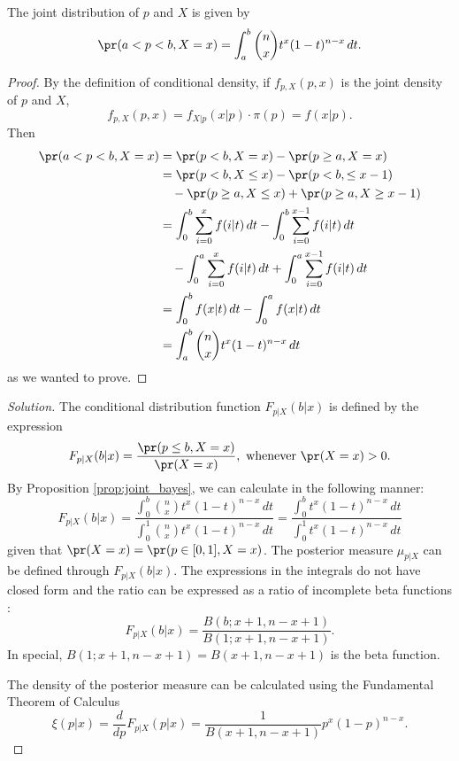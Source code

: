 \begin{proposition}
    \label{prop:joint_bayes}
    The joint distribution of $p$ and $X$ is given by
    \begin{equation*}
     \pr(a < p < b, X = x) = \int_{a}^{b} \binom{n}{x} t^x(1-t)^{n-x}\,dt.
    \end{equation*}
\end{proposition}

\begin{proof}
    By the definition of conditional density, if $f_{p,X}(p, x)$ is the
    joint density of $p$ and $X$, 
    $$
    f_{p,X}(p, x) = f_{X|p}(x|p)\cdot \pi(p) = f(x|p).$$  
    Then 
    \begin{equation*}
        \begin{split}
            \pr(a < p < b, X = x) &= \pr(p < b, X = x) - \pr(p \ge a, X = x) \\ 
            &= \pr(p < b, X \le x) - \pr(p < b, \le x - 1) \\
            &~~~- \pr(p \ge a, X \le x) + \pr(p \ge a, X \ge x -1) \\
            &= \int_0^b \sum_{i=0}^x f(i|t) \, dt - \int_0^b \sum_{i=0}^{x-1} f(i|t) \, dt \\ 
            &~~~-  
            \int_0^a \sum_{i=0}^x f(i|t) \, dt + \int_0^a \sum_{i=0}^{x-1} f(i|t) \, dt \\
            &= \int_0^b f(x|t)\, dt - \int_0^a f(x|t)\, dt \\
            &= \int_a^b \binom{n}{x} t^x(1 - t)^{n-x} \, dt
        \end{split}
    \end{equation*}
    as we wanted to prove. 
\end{proof}

\begin{proof}[Solution]
    The conditional distribution function $F_{p|X}(b|x)$ is defined by the expression
    $$
    F_{p|X}(b|x) = \frac{\pr(p \le b, X = x)}{\pr(X = x)}, \text{ whenever } \pr(X = x) > 0.
    $$
    By Proposition \ref{prop:joint_bayes}, we can calculate in the following
    manner:
    $$
    F_{p|X}(b|x) = \frac{\int_{0}^{b} \binom{n}{x} t^x(1-t)^{n-x}\,dt}{\int_{0}^{1} \binom{n}{x} t^x(1-t)^{n-x}\,dt} = \frac{\int_{0}^{b} t^x(1-t)^{n-x}\,dt}{\int_{0}^{1} t^x(1-t)^{n-x}\,dt}
    $$
    given that $\pr(X = x) = \pr(p \in [0,1], X = x)$. The posterior measure
    $\mu_{p|X}$ can be defined through $F_{p|X}(b|x)$. The expressions in the
    integrals do not have closed form and the ratio can be expressed as a
    ratio of incomplete beta functions \cite{beta}: 
    $$F_{p|X}(b|x) = \frac{B(b; x+1, n-x+1)}{B(1; x+1, n-x+1)}.$$
    In special, $B(1;x+1,n-x+1) = B(x+1,n-x+1)$ is the beta function. 

    The density of the posterior measure can be calculated using the
    Fundamental Theorem of Calculus \cite{calculus}
    \begin{equation}
        \label{eq:posterior-1b}
        \xi(p|x) = \frac{d}{dp}F_{p|X}(p|x) = \frac{1}{B(x+1,n-x+1)}p^x(1 - p)^{n-x}.
    \end{equation}
\end{proof}